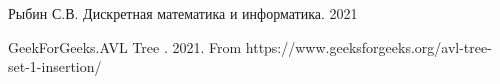 
\begin{thebibliography}{X}
   Рыбин С.В. Дискретная математика и информатика. 2021

   GeekForGeeks.AVL Tree . 2021. From
                    https://www.geeksforgeeks.org/avl-tree-set-1-insertion/


\end{thebibliography}
